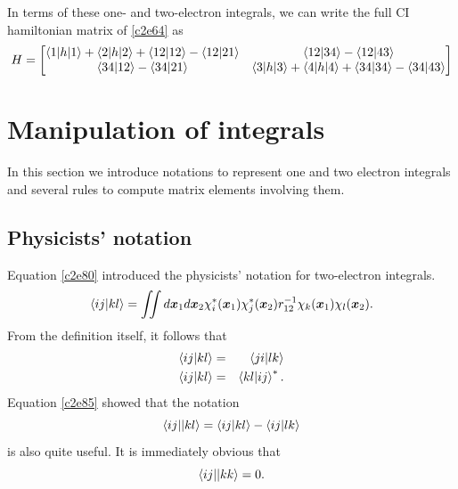 In terms of these one- and two-electron integrals, we can write the full CI
hamiltonian matrix of \eqref{c2e64} as
\begin{equation}\label{c2e85}
H = \begin{bmatrix}
\braket{1|h|1}+\braket{2|h|2}+\braket{12|12}-\braket{12|21} &
\braket{12|34} - \braket{12|43} \\
\braket{34|12} - \braket{34|21} &
\braket{3|h|3}+\braket{4|h|4}+\braket{34|34}-\braket{34|43}
\end{bmatrix}
\end{equation}

\section{Manipulation of integrals}\label{c2s9}
In this section we introduce notations to represent one and two electron 
integrals and several rules to compute matrix elements involving them.

\subsection{Physicists' notation}
Equation \eqref{c2e80} introduced the physicists' notation for two-electron
integrals.
\[
\braket{ij|kl} = \iint d\bm{x}_1d\bm{x}_2
\chi_i^\ast(\bm{x}_1)\chi_j^\ast(\bm{x}_2)r_{12}^{-1}
\chi_k(\bm{x}_1)\chi_l(\bm{x}_2).
\]
From the definition itself, it follows that
\begin{eqnarray}
\braket{ij|kl} &=& \braket{ji|lk} \label{c2e86}\\
\braket{ij|kl} &=& \braket{kl|ij}^\ast.\label{c2e87}
\end{eqnarray}
Equation \eqref{c2e85} showed that the notation
\begin{equation}\label{c2e88}
\braket{ij||kl} = \braket{ij|kl} - \braket{ij|lk}
\end{equation}
is also quite useful. It is immediately obvious that
\begin{equation}\label{c2e89}
\braket{ij||kk} = 0.
\end{equation}

